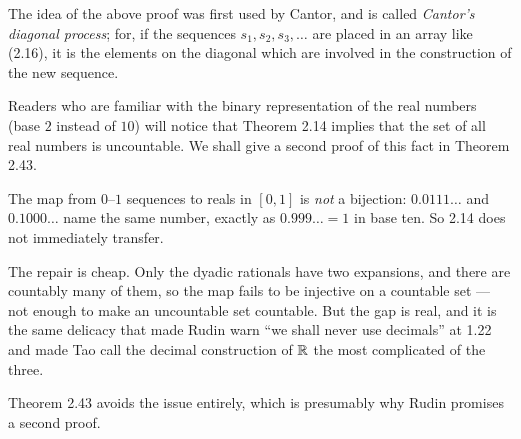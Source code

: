 \begin{center}
\end{center}

The idea of the above proof was first used by Cantor, and is called
\emph{Cantor's diagonal process}; for, if the sequences $s_1,s_2,s_3,\dots$
are placed in an array like (2.16), it is the elements on the diagonal which
are involved in the construction of the new sequence.

Readers who are familiar with the binary representation of the real numbers
(base $2$ instead of $10$) will notice that Theorem 2.14 implies that the set
of all real numbers is uncountable. We shall give a second proof of this fact
in Theorem 2.43.

\begin{pitfall}
The map from $0$--$1$ sequences to reals in $[0,1]$ is \emph{not} a bijection:
$0.0111\dots$ and $0.1000\dots$ name the same number, exactly as $0.999\dots =
1$ in base ten. So 2.14 does not immediately transfer.

The repair is cheap. Only the dyadic rationals have two expansions, and there
are countably many of them, so the map fails to be injective on a countable
set --- not enough to make an uncountable set countable. But the gap is real,
and it is the same delicacy that made Rudin warn ``we shall never use
decimals'' at 1.22 and made Tao call the decimal construction of $\mathbb{R}$ the most
complicated of the three.

Theorem 2.43 avoids the issue entirely, which is presumably why Rudin promises
a second proof.
\end{pitfall}
